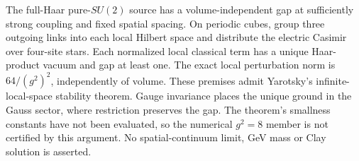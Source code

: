 The full-Haar pure-$SU(2)$ source has a volume-independent gap at sufficiently
strong coupling and fixed spatial spacing. On periodic cubes, group three
outgoing links into each local Hilbert space and distribute the electric
Casimir over four-site stars. Each normalized local classical term has a unique
Haar-product vacuum and gap at least one. The exact local perturbation norm is
$64/(g^2)^2$, independently of volume. These premises admit Yarotsky's
infinite-local-space stability theorem. Gauge invariance places the unique
ground in the Gauss sector, where restriction preserves the gap. The theorem's
smallness constants have not been evaluated, so the numerical $g^2=8$ member is
not certified by this argument. No spatial-continuum limit, GeV mass or Clay
solution is asserted.
